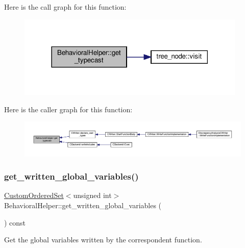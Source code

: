Here is the call graph for this function\+:
\nopagebreak
\begin{figure}[H]
\begin{center}
\leavevmode
\includegraphics[width=309pt]{dd/db2/classBehavioralHelper_ad7b32825859d731ce27077af3c130ea0_cgraph}
\end{center}
\end{figure}
Here is the caller graph for this function\+:
\nopagebreak
\begin{figure}[H]
\begin{center}
\leavevmode
\includegraphics[width=350pt]{dd/db2/classBehavioralHelper_ad7b32825859d731ce27077af3c130ea0_icgraph}
\end{center}
\end{figure}
\mbox{\label{classBehavioralHelper_a1e19a50936f2a778d5bf785a78be2054}} 
\subsubsection{\texorpdfstring{get\+\_\+written\+\_\+global\+\_\+variables()}{get\_written\_global\_variables()}}
{\footnotesize\ttfamily \hyperlink{classCustomOrderedSet}{Custom\+Ordered\+Set}$<$unsigned int$>$ Behavioral\+Helper\+::get\+\_\+written\+\_\+global\+\_\+variables (\begin{DoxyParamCaption}{ }\end{DoxyParamCaption}) const}



Get the global variables written by the correspondent function. 

